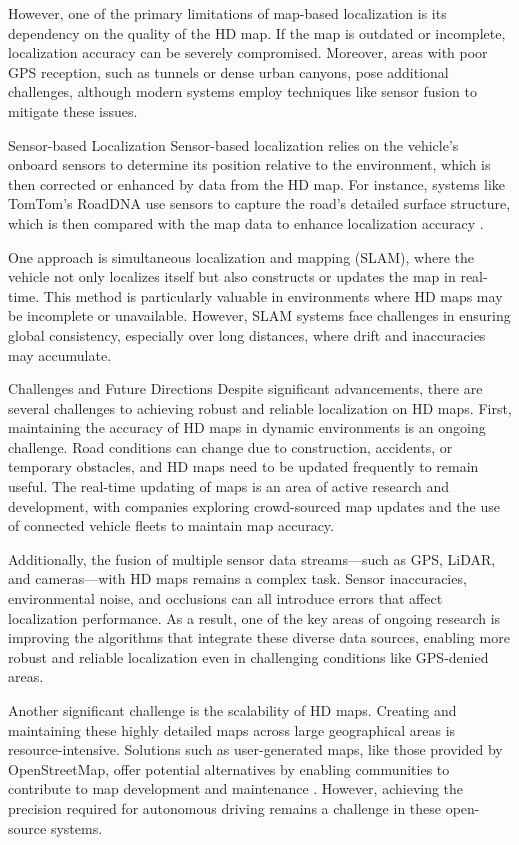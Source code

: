 However, one of the primary limitations of map-based localization is its dependency on the quality of the HD map. If the map is outdated or incomplete, localization accuracy can be severely compromised. Moreover, areas with poor GPS reception, such as tunnels or dense urban canyons, pose additional challenges, although modern systems employ techniques like sensor fusion to mitigate these issues.

Sensor-based Localization
Sensor-based localization relies on the vehicle’s onboard sensors to determine its position relative to the environment, which is then corrected or enhanced by data from the HD map. For instance, systems like TomTom’s RoadDNA use sensors to capture the road's detailed surface structure, which is then compared with the map data to enhance localization accuracy .

One approach is simultaneous localization and mapping (SLAM), where the vehicle not only localizes itself but also constructs or updates the map in real-time. This method is particularly valuable in environments where HD maps may be incomplete or unavailable. However, SLAM systems face challenges in ensuring global consistency, especially over long distances, where drift and inaccuracies may accumulate.

Challenges and Future Directions
Despite significant advancements, there are several challenges to achieving robust and reliable localization on HD maps. First, maintaining the accuracy of HD maps in dynamic environments is an ongoing challenge. Road conditions can change due to construction, accidents, or temporary obstacles, and HD maps need to be updated frequently to remain useful. The real-time updating of maps is an area of active research and development, with companies exploring crowd-sourced map updates and the use of connected vehicle fleets to maintain map accuracy.

Additionally, the fusion of multiple sensor data streams—such as GPS, LiDAR, and cameras—with HD maps remains a complex task. Sensor inaccuracies, environmental noise, and occlusions can all introduce errors that affect localization performance. As a result, one of the key areas of ongoing research is improving the algorithms that integrate these diverse data sources, enabling more robust and reliable localization even in challenging conditions like GPS-denied areas.

Another significant challenge is the scalability of HD maps. Creating and maintaining these highly detailed maps across large geographical areas is resource-intensive. Solutions such as user-generated maps, like those provided by OpenStreetMap, offer potential alternatives by enabling communities to contribute to map development and maintenance . However, achieving the precision required for autonomous driving remains a challenge in these open-source systems.

